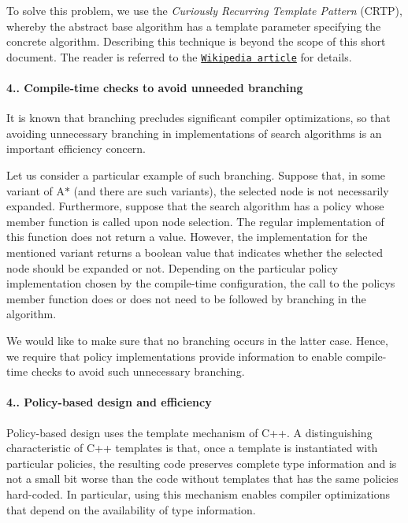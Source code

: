 To solve this problem, we use the {\itshape Curiously Recurring Template Pattern} (C\+R\+TP), whereby the abstract base algorithm has a template parameter specifying the concrete algorithm. Describing this technique is beyond the scope of this short document. The reader is referred to the \href{https://en.wikipedia.org/wiki/Curiously_recurring_template_pattern}{\tt Wikipedia article} for details.\hypertarget{index_s-branching}{}\paragraph{4.. Compile-\/time checks to avoid unneeded branching}\label{index_s-branching}
It is known that branching precludes significant compiler optimizations, so that avoiding unnecessary branching in implementations of search algorithms is an important efficiency concern.

Let us consider a particular example of such branching. Suppose that, in some variant of A$\ast$ (and there are such variants), the selected node is not necessarily expanded. Furthermore, suppose that the search algorithm has a policy whose member function is called upon node selection. The regular implementation of this function does not return a value. However, the implementation for the mentioned variant returns a boolean value that indicates whether the selected node should be expanded or not. Depending on the particular policy implementation chosen by the compile-\/time configuration, the call to the policy\textquotesingle{}s member function does or does not need to be followed by branching in the algorithm.

We would like to make sure that no branching occurs in the latter case. Hence, we require that policy implementations provide information to enable compile-\/time checks to avoid such unnecessary branching.\hypertarget{index_s-policy-efficiency}{}\paragraph{4.. Policy-\/based design and efficiency}\label{index_s-policy-efficiency}
Policy-\/based design uses the template mechanism of C++. A distinguishing characteristic of C++ templates is that, once a template is instantiated with particular policies, the resulting code preserves complete type information and is not a small bit worse than the code without templates that has the same policies hard-\/coded. In particular, using this mechanism enables compiler optimizations that depend on the availability of type information.

